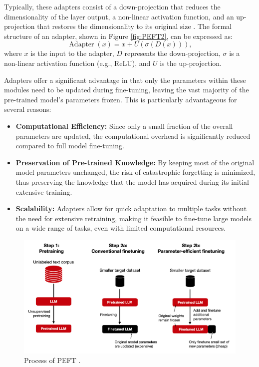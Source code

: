 \documentclass[conference]{IEEEtran}
\begin{document}
Typically, these adapters consist of a down-projection that reduces the dimensionality of the layer output, a non-linear activation function, and an up-projection that restores the dimensionality to its original size \cite{pfeiffer2020adapterhub}. The formal structure of an adapter, shown in Figure \ref{fig:PEFT2}, can be expressed as:
\[
\operatorname{Adapter}(x) = x + U(\sigma(D(x))),
\]
where $x$ is the input to the adapter, $D$ represents the down-projection, $\sigma$ is a non-linear activation function (e.g., ReLU), and $U$ is the up-projection.

Adapters offer a significant advantage in that only the parameters within these modules need to be updated during fine-tuning, leaving the vast majority of the pre-trained model's parameters frozen. This is particularly advantageous for several reasons:
\begin{itemize}
    \item \textbf{Computational Efficiency:} Since only a small fraction of the overall parameters are updated, the computational overhead is significantly reduced compared to full model fine-tuning.
    \item \textbf{Preservation of Pre-trained Knowledge:} By keeping most of the original model parameters unchanged, the risk of catastrophic forgetting is minimized, thus preserving the knowledge that the model has acquired during its initial extensive training.
    \item \textbf{Scalability:} Adapters allow for quick adaptation to multiple tasks without the need for extensive retraining, making it feasible to fine-tune large models on a wide range of tasks, even with limited computational resources.
\end{itemize}

\cite{Poth2023}

\begin{figure}[h!]
    \centering
    \includegraphics[width=.65\linewidth]{pictures/PEFT1.png}
    \caption[PEFT1]{Process of PEFT \cite{Raschka2023}.}
    \label{fig:PEFT1}
\end{figure}
\end{document}
